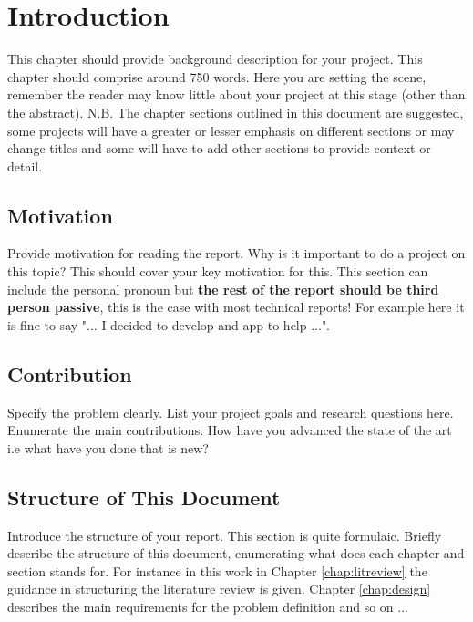 \chapter{Introduction}
\label{chap:intro}

This chapter should provide background description for your project. This chapter should comprise around 750 words. Here you are setting the scene, remember the reader may know little about your project at this stage (other than the abstract). N.B. The chapter sections outlined in this document are suggested, some projects will have a greater or lesser emphasis on different sections or may change titles and some will have to add other sections to provide context or detail.

\section{Motivation}
Provide motivation for reading the report. Why is it important to do a project on this topic? This should cover your key motivation for this. This section can include the personal pronoun but \textbf{the rest of the report should be third person passive}, this is the case with most technical reports! For example here it is fine to say "... I decided to develop and app to help ...".

\section{Contribution}
Specify the problem clearly. List your project goals and research questions here. Enumerate the main contributions. How have you advanced the state of the art i.e what have you done that is new?

\section{Structure of This Document}
Introduce the structure of your report. This section is quite formulaic. Briefly describe the structure of this document, enumerating what does each chapter and section stands for. For instance in this work in Chapter \ref{chap:litreview} the guidance in structuring the literature review is given. Chapter \ref{chap:design} describes the main requirements for the problem definition and so on ...